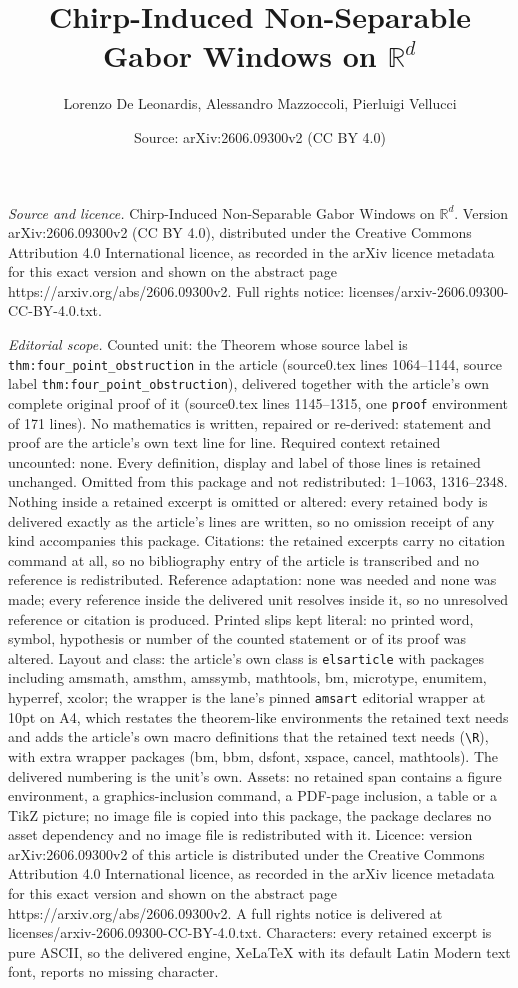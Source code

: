 \documentclass[10pt,a4paper]{amsart}
\title[Chirp-Induced Non-Separable Gabor Windows on $\mathbb{R}^d$]{Chirp-Induced Non-Separable Gabor Windows on $\mathbb{R}^d$}
\author{Lorenzo De Leonardis, Alessandro Mazzoccoli, Pierluigi Vellucci}
\date{Source: arXiv:2606.09300v2 (CC BY 4.0)}
\begin{document}
\maketitle

\noindent\emph{Source and licence.} Chirp-Induced Non-Separable Gabor Windows on $\mathbb{R}^d$. Version arXiv:2606.09300v2 (CC BY 4.0), distributed under the Creative Commons Attribution 4.0 International licence, as recorded in the arXiv licence metadata for this exact version and shown on the abstract page https://arxiv.org/abs/2606.09300v2. Full rights notice: licenses/arxiv-2606.09300-CC-BY-4.0.txt.\par\smallskip

\noindent\textit{Editorial scope.} Counted unit: the Theorem whose source label is \texttt{thm:four\_point\_obstruction} in the article (source0.tex lines 1064--1144, source label \texttt{thm:four\_point\_obstruction}), delivered together with the article's own complete original proof of it (source0.tex lines 1145--1315, one \texttt{proof} environment of 171 lines). No mathematics is written, repaired or re-derived: statement and proof are the article's own text line for line. Required context retained uncounted: none. Every definition, display and label of those lines is retained unchanged. Omitted from this package and not redistributed: 1--1063, 1316--2348. Nothing inside a retained excerpt is omitted or altered: every retained body is delivered exactly as the article's lines are written, so no omission receipt of any kind accompanies this package. Citations: the retained excerpts carry no citation command at all, so no bibliography entry of the article is transcribed and no reference is redistributed. Reference adaptation: none was needed and none was made; every reference inside the delivered unit resolves inside it, so no unresolved reference or citation is produced. Printed slips kept literal: no printed word, symbol, hypothesis or number of the counted statement or of its proof was altered. Layout and class: the article's own class is \texttt{elsarticle} with packages including amsmath, amsthm, amssymb, mathtools, bm, microtype, enumitem, hyperref, xcolor; the wrapper is the lane's pinned \texttt{amsart} editorial wrapper at 10pt on A4, which restates the theorem-like environments the retained text needs and adds the article's own macro definitions that the retained text needs (\texttt{\textbackslash R}), with extra wrapper packages (bm, bbm, dsfont, xspace, cancel, mathtools). The delivered numbering is the unit's own. Assets: no retained span contains a figure environment, a graphics-inclusion command, a PDF-page inclusion, a table or a TikZ picture; no image file is copied into this package, the package declares no asset dependency and no image file is redistributed with it. Licence: version arXiv:2606.09300v2 of this article is distributed under the Creative Commons Attribution 4.0 International licence, as recorded in the arXiv licence metadata for this exact version and shown on the abstract page https://arxiv.org/abs/2606.09300v2. A full rights notice is delivered at licenses/arxiv-2606.09300-CC-BY-4.0.txt. Characters: every retained excerpt is pure ASCII, so the delivered engine, XeLaTeX with its default Latin Modern text font, reports no missing character.
\end{document}
